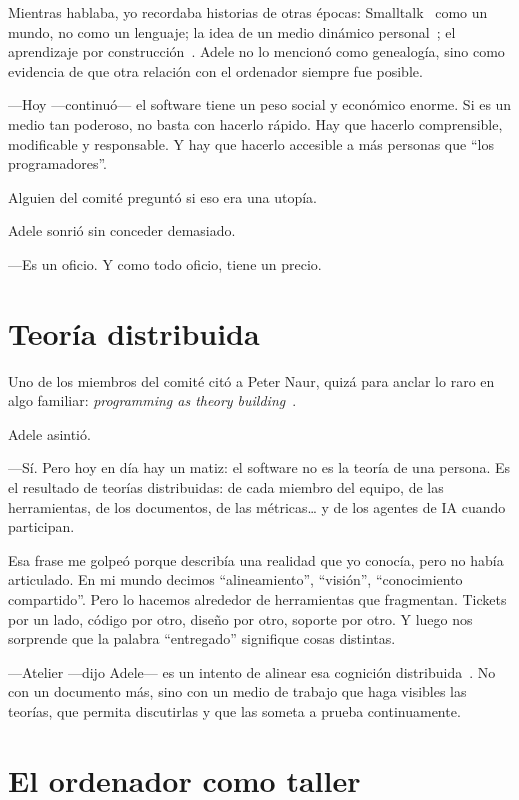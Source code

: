 \documentclass[11pt,a4paper]{article}
\begin{document}
Mientras hablaba, yo recordaba historias de otras épocas:
Smalltalk~\cite{ingalls} como un mundo, no como un lenguaje; la idea de un
medio dinámico personal~\cite{kay}; el aprendizaje por
construcción~\cite{constructionism}. Adele no lo mencionó como genealogía,
sino como evidencia de que otra relación con el ordenador siempre fue posible.

---Hoy ---continuó--- el software tiene un peso social y económico enorme. Si
es un medio tan poderoso, no basta con hacerlo rápido. Hay que hacerlo
comprensible, modificable y responsable. Y hay que hacerlo accesible a más
personas que ``los programadores''.

Alguien del comité preguntó si eso era una utopía.

Adele sonrió sin conceder demasiado.

---Es un oficio. Y como todo oficio, tiene un precio.

\section{Teoría distribuida}

Uno de los miembros del comité citó a Peter Naur, quizá para anclar lo raro en
algo familiar: \emph{programming as theory building}~\cite{naur}.

Adele asintió.

---Sí. Pero hoy en día hay un matiz: el software no es la teoría de una
persona. Es el resultado de teorías distribuidas: de cada miembro del equipo,
de las herramientas, de los documentos, de las métricas\ldots{} y de los
agentes de IA cuando participan.

Esa frase me golpeó porque describía una realidad que yo conocía, pero no
había articulado. En mi mundo decimos ``alineamiento'', ``visión'',
``conocimiento compartido''. Pero lo hacemos alrededor de herramientas que
fragmentan. Tickets por un lado, código por otro, diseño por otro, soporte por
otro. Y luego nos sorprende que la palabra ``entregado'' signifique cosas
distintas.

---Atelier ---dijo Adele--- es un intento de alinear esa cognición
distribuida~\cite{dcog}. No con un documento más, sino con un medio de trabajo
que haga visibles las teorías, que permita discutirlas y que las someta a
prueba continuamente.

\section{El ordenador como taller}
\end{document}
